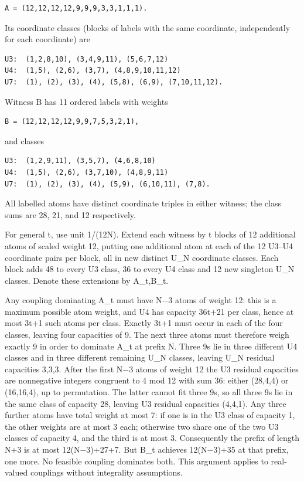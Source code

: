\documentclass[11pt]{article}
\begin{document}
\begin{verbatim}
A = (12,12,12,12,9,9,9,3,3,1,1,1).
\end{verbatim}

Its coordinate classes (blocks of labels with the same coordinate, independently for each coordinate) are

\begin{verbatim}
U3:  (1,2,8,10), (3,4,9,11), (5,6,7,12)
U4:  (1,5), (2,6), (3,7), (4,8,9,10,11,12)
U7:  (1), (2), (3), (4), (5,8), (6,9), (7,10,11,12).
\end{verbatim}

Witness B has 11 ordered labels with weights

\begin{verbatim}
B = (12,12,12,12,9,9,7,5,3,2,1),
\end{verbatim}

and classes

\begin{verbatim}
U3:  (1,2,9,11), (3,5,7), (4,6,8,10)
U4:  (1,5), (2,6), (3,7,10), (4,8,9,11)
U7:  (1), (2), (3), (4), (5,9), (6,10,11), (7,8).
\end{verbatim}

All labelled atoms have distinct coordinate triples in either witness; the class sums are 28, 21, and 12 respectively.

For general t, use unit 1/(12N). Extend each witness by t blocks of 12 additional atoms of scaled weight 12, putting one additional atom at each of the 12 U3--U4 coordinate pairs per block, all in new distinct U\_N coordinate classes. Each block adds 48 to every U3 class, 36 to every U4 class and 12 new singleton U\_N classes. Denote these extensions by A\_t,B\_t.

Any coupling dominating A\_t must have N−3 atoms of weight 12: this is a maximum possible atom weight, and U4 has capacity 36t+21 per class, hence at most 3t+1 such atoms per class. Exactly 3t+1 must occur in each of the four classes, leaving four capacities of 9. The next three atoms must therefore weigh exactly 9 in order to dominate A\_t at prefix N. Three 9s lie in three different U4 classes and in three different remaining U\_N classes, leaving U\_N residual capacities 3,3,3. After the first N−3 atoms of weight 12 the U3 residual capacities are nonnegative integers congruent to 4 mod 12 with sum 36: either (28,4,4) or (16,16,4), up to permutation. The latter cannot fit three 9s, so all three 9s lie in the same class of capacity 28, leaving U3 residual capacities (4,4,1). Any three further atoms have total weight at most 7: if one is in the U3 class of capacity 1, the other weights are at most 3 each; otherwise two share one of the two U3 classes of capacity 4, and the third is at most 3. Consequently the prefix of length N+3 is at most 12(N−3)+27+7. But B\_t achieves 12(N−3)+35 at that prefix, one more. No feasible coupling dominates both. This argument applies to real-valued couplings without integrality assumptions.
\end{document}
